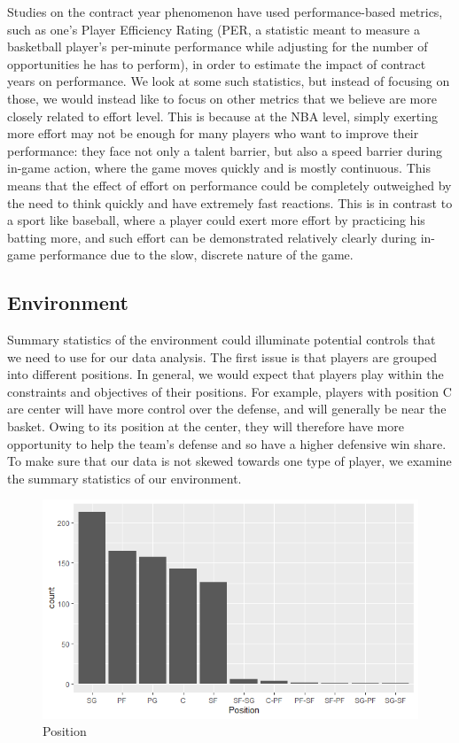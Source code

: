 \documentclass[12pt]{article}
\begin{document}
	Studies on the contract year phenomenon have used performance-based metrics, such as one's Player Efficiency Rating (PER, a statistic meant to measure a basketball player's per-minute performance while adjusting for the number of opportunities he has to perform), in order to estimate the impact of contract years on performance. We look at some such statistics, but instead of focusing on those, we would instead like to focus on other metrics that we believe are more closely related to effort level. This is because at the NBA level, simply exerting more effort may not be enough for many players who want to improve their performance: they face not only a talent barrier, but also a speed barrier during in-game action, where the game moves quickly and is mostly continuous. This means that the effect of effort on performance could be completely outweighed by the need to think quickly and have extremely fast reactions. This is in contrast to a sport like baseball, where a player could exert more effort by practicing his batting more, and such effort can be demonstrated relatively clearly during in-game performance due to the slow, discrete nature of the game.
	
	\subsection{Environment}
	
	Summary statistics of the environment could illuminate potential controls that we need to use for our data analysis. The first issue is that players are grouped into different positions. In general, we would expect that players play within the constraints and objectives of their positions. For example, players with position C are center will have more control over the defense, and will generally be near the basket. Owing to its position at the center, they will therefore have more opportunity to help the team's defense and so have a higher defensive win share. To make sure that our data is not skewed towards one type of player, we examine the summary statistics of our environment.
	
	\begin{figure}[H]
		\centering
		\includegraphics[width=\textwidth]{position.png}
		\caption{Position}
		\label{fig:Position}
	\end{figure}
	
\end{document}
